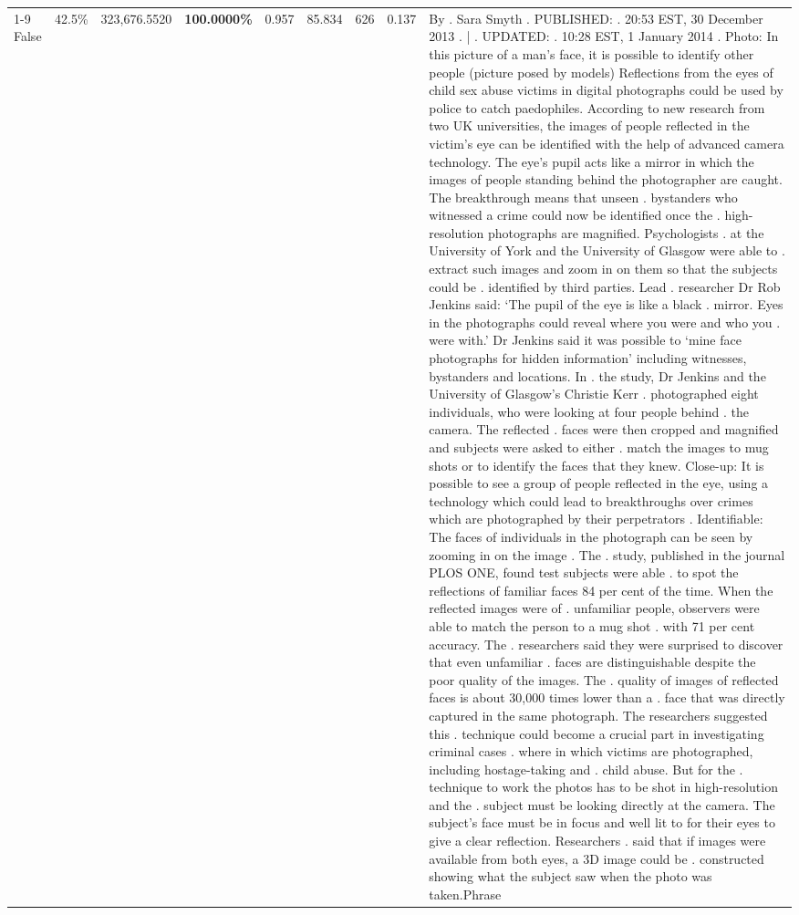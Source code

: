 \begin{table}[H]
\begin{tabular}{lllrlllll}
\cline{1-9} \cline{2-9}
False & 42.5\% & 323,676.5520 & \bfseries \color{red} 100.0000\% & 0.957 & 85.834 & 626 & 0.137 & By . Sara Smyth . PUBLISHED: . 20:53 EST, 30 December 2013 . | . UPDATED: . 10:28 EST, 1 January 2014 . Photo: In this picture of a man's face, it is possible to identify other people (picture posed by models) Reflections from the eyes of child sex abuse victims in digital photographs could be used by police to catch paedophiles. According to new research from two UK universities, the images of people reflected in the victim's eye can be identified with the help of advanced camera technology. The eye's pupil acts like a mirror in which the images of people standing behind the photographer are caught. The breakthrough means that unseen . bystanders who witnessed a crime could now be identified once the . high-resolution photographs are magnified. Psychologists . at the University of York and the University of Glasgow were able to . extract such images and zoom in on them so that the subjects could be . identified by third parties. Lead . researcher Dr Rob Jenkins said: ‘The pupil of the eye is like a black . mirror. Eyes in the photographs could reveal where you were and who you . were with.' Dr Jenkins said it was possible to ‘mine face photographs for hidden information' including witnesses, bystanders and locations. In . the study, Dr Jenkins and the University of Glasgow's Christie Kerr . photographed eight individuals, who were looking at four people behind . the camera. The reflected . faces were then cropped and magnified and subjects were asked to either . match the images to mug shots or to identify the faces that they knew. Close-up: It is possible to see a group of people reflected in the eye, using a technology which could lead to breakthroughs over crimes which are photographed by their perpetrators . Identifiable: The faces of individuals in the photograph can be seen by zooming in on the image . The . study, published in the journal PLOS ONE, found test subjects were able . to spot the reflections of familiar faces 84 per cent of the time. When the reflected images were of . unfamiliar people, observers were able to match the person to a mug shot . with 71 per cent accuracy. The . researchers said they were surprised to discover that even unfamiliar . faces are distinguishable despite the poor quality of the images. The . quality of images of reflected faces is about 30,000 times lower than a . face that was directly captured in the same photograph. The researchers suggested this . technique could become a crucial part in investigating criminal cases . where in which victims are photographed, including hostage-taking and . child abuse. But for the . technique to work the photos has to be shot in high-resolution and the . subject must be looking directly at the camera. The subject's face must be in focus and well lit to for their eyes to give a clear reflection. Researchers . said that if images were available from both eyes, a 3D image could be . constructed showing what the subject saw when the photo was taken.Phrase \\

\end{tabular}
\end{table}
